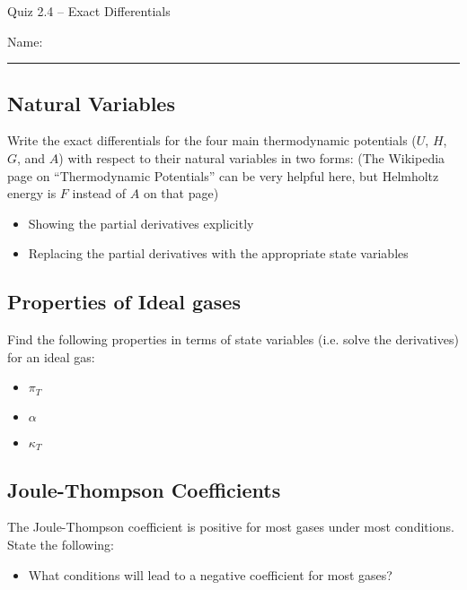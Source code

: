\documentclass[11pt, letterpaper]{memoir}
\begin{document}
	\begin{center}
		{\large Quiz 2.4 -- Exact Differentials}
	\end{center}
	{\large Name: \rule[-1mm]{4in}{.1pt} 

\subsection*{Natural Variables}
Write the exact differentials for the four main thermodynamic potentials ($U$, $H$, $G$, and $A$) with respect to their natural variables in two forms: (The Wikipedia page on “Thermodynamic Potentials” can be very helpful here, but Helmholtz energy is $F$ instead of $A$ on that page)
\begin{itemize}
	\item Showing the partial derivatives explicitly
	
	\vspace{3em}
	\item Replacing the partial derivatives with the appropriate state variables
\end{itemize}

\vspace{3em}
\subsection*{Properties of Ideal gases}
Find the following properties in terms of state variables (i.e. solve the derivatives) for an ideal gas:
\begin{itemize}
	\item $\pi_T$
	
	\vspace{3em}
	\item $\alpha$
	
	\vspace{3em}
	\item $\kappa_T$
\end{itemize}

\vspace{3em}
\subsection*{Joule-Thompson Coefficients}
The Joule-Thompson coefficient is positive for most gases under most conditions. State the following:
\begin{itemize}
	\item What conditions will lead to a negative coefficient for most gases?
	

\end{itemize}}
\end{document}
